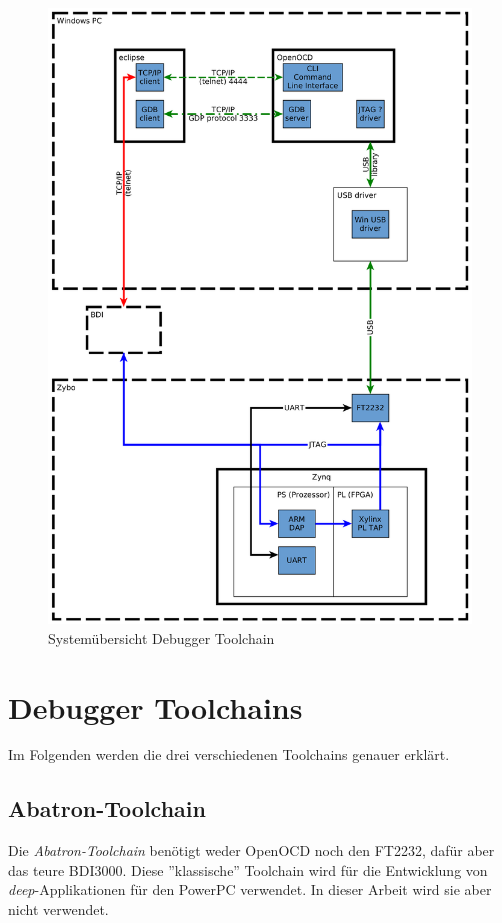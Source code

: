 \begin{figure}[htbp]
	\centering
		\includegraphics[width=\textwidth,height=\textheight,keepaspectratio]{graphs/embeddedDebuggerToolchain.png}
	\caption{Systemübersicht Debugger Toolchain}
	\label{fig:UebersichtDebuggerToolchain}
\end{figure}


\section{Debugger Toolchains}
Im Folgenden werden die drei verschiedenen Toolchains genauer erklärt.

\subsection{Abatron-Toolchain}
Die \textit{Abatron-Toolchain} benötigt weder OpenOCD noch den FT2232, dafür aber das teure BDI3000.
Diese ''klassische'' Toolchain wird für die Entwicklung von \textit{deep}-Applikationen für den PowerPC verwendet.
In dieser Arbeit wird sie aber nicht verwendet.


